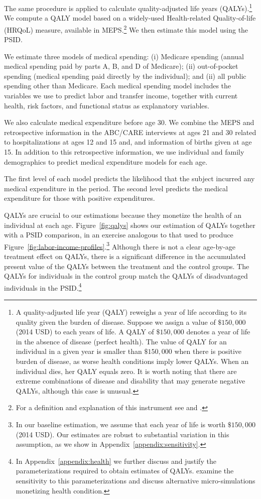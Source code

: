 The same procedure is applied to calculate quality-adjusted life years (QALYs).\footnote{A quality-adjusted life year (QALY) reweighs a year of life according to its quality given the burden of disease. Suppose we assign a value of $\$150,000$ (2014 USD) to each years of life. A QALY of $\$150,000$ denotes a year of life in the absence of disease (perfect health). The value of QALY for an individual in a given year is smaller than $\$150,000$ when there is positive burden of disease, as worse health conditions imply lower QALYs. When an individual dies, her QALY equals zero. It is worth noting that there are extreme combinations of disease and disability that may generate negative QALYs, although this case is unusual.} We compute a QALY model based on a widely-used Health-related Quality-of-life (HRQoL) measure, available in MEPS.\footnote{For a definition and explanation of this instrument see \citet{Shaw_etal_2005_EQ5D_MC} and \citet{Dolan_1997_Modeling_MC}.} We then estimate this model using the PSID.

We estimate three models of medical spending: (i) Medicare spending (annual medical spending paid by parts A, B, and D of Medicare); (ii) out-of-pocket spending (medical spending paid directly by the individual); and (ii) all public spending other than Medicare. Each medical spending model includes the variables we use to predict labor and transfer income, together with current health, risk factors, and functional status as explanatory variables.

We also calculate medical expenditure before age 30. We combine the MEPS and retrospective information in the ABC/CARE interviews at ages 21 and 30 related to hospitalizations at ages 12 and 15 and, and information of births given at age 15. In addition to this retrospective information, we use individual and family demographics to predict medical expenditure models for each age.

The first level of each model predicts the likelihood that the subject incurred any medical expenditure in the period. The second level predicts the medical expenditure for those with positive expenditures.

QALYs are crucial to our estimations because they monetize the health of an individual at each age. Figure~\ref{fig:qalys} shows our estimation of QALYs together with a PSID comparison, in an exercise analogous to that used to produce Figure~\ref{fig:labor-income-profiles}.\footnote{In our baseline estimation, we assume that each year of life is worth  $\$150,000$ (2014 USD). Our estimates are robust to substantial variation in this assumption, as we show in Appendix~\ref{appendix:sensitivity}.} Although there is not a clear age-by-age treatment effect on QALYs, there is a significant difference in the accumulated present value of the QALYs between the treatment and the control groups. The QALYs for individuals in the control group match the QALYs of disadvantaged individuals in the PSID.\footnote{In Appendix~\ref{appendix:health} we further discuss and justify the parameterizations required to obtain estimates of QALYs. \citet{Goldman_etal_2015_Future-America-Model} examine the sensitivity to this parameterizations and discuss alternative micro-simulations monetizing health condition.} 

